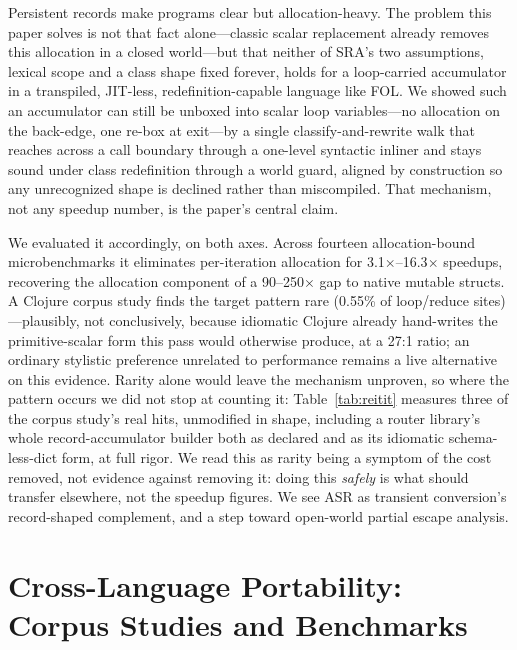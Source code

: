 \documentclass[sigplan,screen,review,anonymous]{acmart}
\begin{document}
Persistent records make programs clear but allocation-heavy. The problem
this paper solves is not that fact alone---classic scalar replacement
already removes this allocation in a closed world---but that
neither of SRA's two assumptions, lexical scope and a class shape fixed
forever, holds for a loop-carried accumulator in a transpiled, JIT-less,
redefinition-capable language like FOL. We showed such an accumulator can
still be unboxed into scalar loop variables---no allocation on the
back-edge, one re-box at exit---by a single classify-and-rewrite walk
that reaches across a call boundary through a one-level syntactic inliner
and stays sound under class redefinition through a world guard, aligned
by construction so any unrecognized shape is declined rather
than miscompiled. That mechanism, not any speedup number, is the paper's
central claim.

We evaluated it accordingly, on both axes. Across fourteen allocation-bound
microbenchmarks it eliminates per-iteration allocation for
3.1$\times$--16.3$\times$ speedups, recovering the allocation component of
a 90--250$\times$ gap to native mutable structs. A Clojure corpus study
finds the target pattern rare (0.55\% of loop/reduce sites)---plausibly,
not conclusively, because idiomatic Clojure already hand-writes the
primitive-scalar form this pass would otherwise produce, at a 27:1
ratio; an ordinary stylistic preference unrelated to performance remains
a live alternative on this evidence. Rarity alone would leave the
mechanism unproven, so where the pattern occurs we did not stop at
counting it: Table~\ref{tab:reitit} measures three of the corpus study's
real hits, unmodified in shape, including a router library's whole
record-accumulator builder both as declared and as its idiomatic
schema-less-dict form, at full rigor. We read this as rarity being
a symptom of the cost removed, not evidence against removing it: doing
this \emph{safely} is what should transfer elsewhere, not the speedup
figures. We see ASR as transient conversion's record-shaped complement,
and a step toward open-world partial escape analysis.




\appendix

\section{Cross-Language Portability: Corpus Studies and Benchmarks}
\label{sec:ports}
\end{document}
